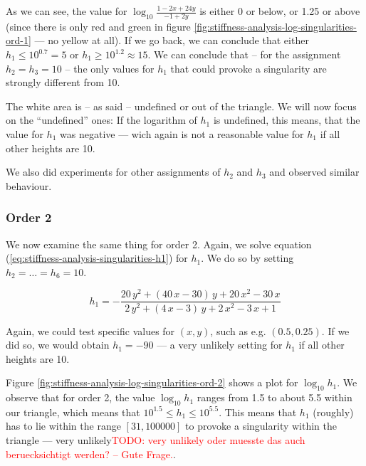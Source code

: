 \documentclass{article}
\newcommand{\todo}[2][]{\textcolor{red}{TODO\ifthenelse{\equal{#1}{}}{}{[#1]}: #2}}
\begin{document}
As we can see, the value for $\log_{10}\frac{1-2x+24y}{-1+2y}$ is either 0 or below, or 1.25 or above (since there is only red and green in figure \ref{fig:stiffness-analysis-log-singularities-ord-1} --- no yellow at all). If we go back, we can conclude that either $h_1 \leq 10^{0.7} = 5$ or $h_1\geq 10^{1.2} \approx 15$. We can conclude that -- for the assignment $h_2=h_3=10$ -- the only values for $h_1$ that could provoke a singularity are strongly different from 10.

The white area is -- as said -- undefined or out of the triangle. We will now focus on the ``undefined'' ones: If the logarithm of $h_1$ is undefined, this means, that the value for $h_1$ was negative --- wich again is not a reasonable value for $h_1$ if all other heights are 10.

We also did experiments for other assignments of $h_2$ and $h_3$ and observed similar behaviour.

\subsubsection{Order 2}
\label{sec:stiffness-analysis-singularities-ord-2}

We now examine the same thing for order 2. Again, we solve equation (\ref{eq:stiffness-analysis-singularities-h1}) for $h_1$. We do so by setting $h_2=\dots=h_6=10$.


\begin{equation*}
  h_1 = -\frac{20\,y^2+\left(40\,x-30\right)\,y+20\,x^2-30\,x}{2\,y^2+
    \left(4\,x-3\right)\,y+2\,x^2-3\,x+1}
\end{equation*}

Again, we could test specific values for $(x,y)$, such as e.g. $(0.5, 0.25)$. If we did so, we would obtain $h_1=-90$ --- a very unlikely setting for $h_1$ if all other heights are 10.

Figure \ref{fig:stiffness-analysis-log-singularities-ord-2} shows a plot for $\log_{10} h_1$. We observe that for order 2, the value $\log_{10} h_1$ ranges from 1.5 to about 5.5 within our triangle, which means that $10^{1.5} \leq h_1 \leq 10^{5.5}$. This means that $h_1$ (roughly) has to lie within the range $\left[ 31, 100000 \right]$ to provoke a singularity within the triangle --- very unlikely\todo{very unlikely oder muesste das auch beruecksichtigt werden? -- Gute Frage.}.
\end{document}
